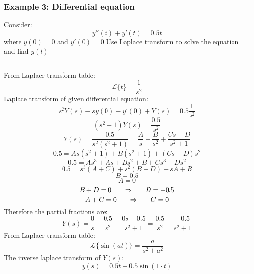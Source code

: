 \subsubsection{Example 3: Differential equation}
Consider:
$$y''(t)+y'(t)=0.5t$$
where $y(0)=0$ and $y'(0)=0$
Use Laplace transform to solve the equation and find $y(t)$

\rule{\textwidth}{0.5pt}

From Laplace transform table:
$$\mathcal{L}\{t\}=\frac{1}{s^2}$$
Laplace transform of given differential equation:
$$s^2Y(s)-sy(0)-y'(0)+Y(s)=0.5\frac{1}{s^2}$$
$$(s^2+1)Y(s)=\frac{0.5}{s^2}$$
$$Y(s)=\frac{0.5}{s^2(s^2+1)}=\frac{A}{s}+\frac{B}{s^2}+\frac{Cs+D}{s^2+1}$$
$$0.5=As(s^2+1)+B(s^2+1)+(Cs+D)s^2$$
$$0.5=As^3+As+Bs^2+B+Cs^3+Ds^2$$
$$0.5=s^3(A+C)+s^2(B+D)+sA+B$$
$$B=0.5$$
$$A=0$$
$$B+D=0{\qquad\Rightarrow\qquad} D=-0.5$$
$$A+C=0{\qquad\Rightarrow\qquad} C=0$$
Therefore the partial fractions are:
$$Y(s)=\frac{0}{s}+\frac{0.5}{s^2}+\frac{0s-0.5}{s^2+1}=\frac{0.5}{s^2}+\frac{-0.5}{s^2+1}$$
From Laplace transform table:
$$\mathcal{L}\{\sin(at)\}=\frac{a}{s^2+a^2}$$
The inverse laplace transform of $Y(s)$:
$$y(s)=0.5t-0.5\sin(1\cdot t)$$
